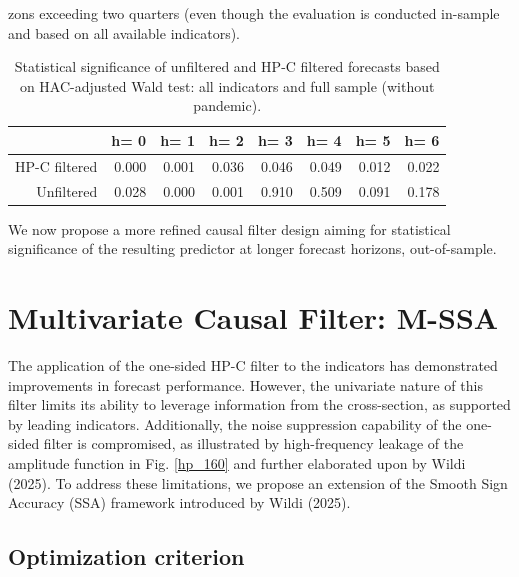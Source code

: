 \documentclass[a4paper]{article}
\begin{document}
zons exceeding two quarters (even though the evaluation is conducted in-sample and based on all available indicators). 






\begin{table}[ht]
\centering
\begin{tabular}{rrrrrrrr}
  \hline
 & h= 0 & h= 1 & h= 2 & h= 3 & h= 4 & h= 5 & h= 6 \\ 
  \hline
HP-C filtered & 0.000 & 0.001 & 0.036 & 0.046 & 0.049 & 0.012 & 0.022 \\ 
  Unfiltered & 0.028 & 0.000 & 0.001 & 0.910 & 0.509 & 0.091 & 0.178 \\ 
   \hline
\end{tabular}
\caption{Statistical significance of unfiltered and HP-C filtered forecasts based on HAC-adjusted Wald test: all indicators and full sample (without pandemic).  } 
\label{f_stat}
\end{table}
We now propose a more refined causal filter design aiming for statistical significance of the resulting predictor at longer forecast horizons, out-of-sample.   




\section{Multivariate Causal Filter: M-SSA}

The application of the one-sided HP-C filter to the indicators has demonstrated improvements in forecast performance. However, the univariate nature of this filter limits its ability to leverage information from the cross-section, as supported by leading indicators. Additionally, the noise suppression capability of the one-sided filter is compromised, as illustrated by high-frequency leakage of the amplitude function in Fig. \eqref{hp_160} and further elaborated upon by Wildi (2025). To address these limitations, we propose an extension of the Smooth Sign Accuracy (SSA) framework introduced by Wildi (2025).


\subsection{Optimization criterion}
\end{document}
